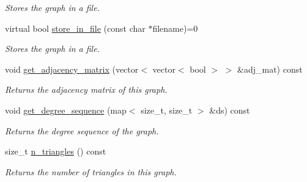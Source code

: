\begin{DoxyCompactItemize}
\begin{DoxyCompactList}\small\item\em Stores the graph in a file. \end{DoxyCompactList}\item 
virtual bool \hyperlink{classlgraph_1_1utils_1_1xxgraph_a5bb7620cd8721fc4b0d031230ab5c3b5}{store\+\_\+in\+\_\+file} (const char $\ast$filename)=0\hypertarget{classlgraph_1_1utils_1_1xxgraph_a5bb7620cd8721fc4b0d031230ab5c3b5}{}\label{classlgraph_1_1utils_1_1xxgraph_a5bb7620cd8721fc4b0d031230ab5c3b5}

\begin{DoxyCompactList}\small\item\em Stores the graph in a file. \end{DoxyCompactList}\item 
void \hyperlink{classlgraph_1_1utils_1_1xxgraph_a401454762f6b4b69f13ab0a10729c457}{get\+\_\+adjacency\+\_\+matrix} (vector$<$ vector$<$ bool $>$ $>$ \&adj\+\_\+mat) const \hypertarget{classlgraph_1_1utils_1_1xxgraph_a401454762f6b4b69f13ab0a10729c457}{}\label{classlgraph_1_1utils_1_1xxgraph_a401454762f6b4b69f13ab0a10729c457}

\begin{DoxyCompactList}\small\item\em Returns the adjacency matrix of this graph. \end{DoxyCompactList}\item 
void \hyperlink{classlgraph_1_1utils_1_1xxgraph_aff73f5ac4cd2732caa0c528eb1c1833c}{get\+\_\+degree\+\_\+sequence} (map$<$ size\+\_\+t, size\+\_\+t $>$ \&ds) const 
\begin{DoxyCompactList}\small\item\em Returns the degree sequence of the graph. \end{DoxyCompactList}\item 
size\+\_\+t \hyperlink{classlgraph_1_1utils_1_1xxgraph_ad4f25a8b29c6f26bc1567cb9c5a564ba}{n\+\_\+triangles} () const 
\begin{DoxyCompactList}\small\item\em Returns the number of triangles in this graph. \end{DoxyCompactList}\end{DoxyCompactItemize}
